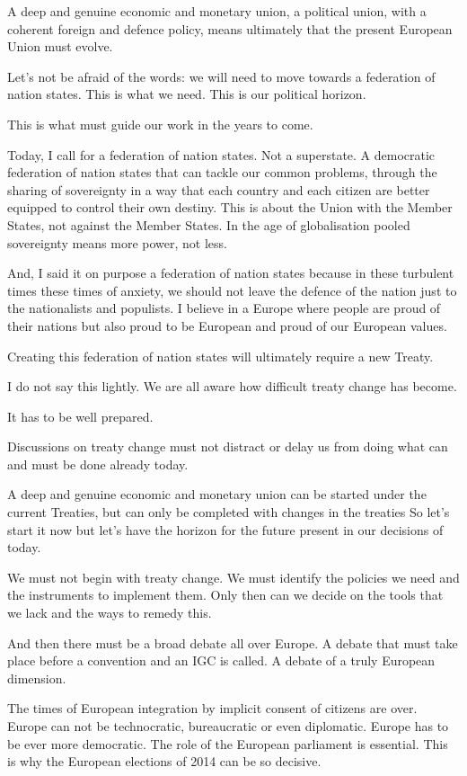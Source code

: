 \documentclass[a4paper,11pt]{article}
\begin{document}
A deep and genuine economic and monetary union, a political union, with a coherent foreign and defence policy, means ultimately that the present European Union must evolve.

Let's not be afraid of the words: we will need to move towards a federation of nation states. This is what we need. This is our political horizon.

This is what must guide our work in the years to come.

Today, I call for a federation of nation states. Not a superstate. A democratic federation of nation states that can tackle our common problems, through the sharing of sovereignty in a way that each country and each citizen are better equipped to control their own destiny. This is about the Union with the Member States, not against the Member States. In the age of globalisation pooled sovereignty means more power, not less.

And, I said it on purpose a federation of nation states because in these turbulent times these times of anxiety, we should not leave the defence of the nation just to the nationalists and populists. I believe in a Europe where people are proud of their nations but also proud to be European and proud of our European values.

Creating this federation of nation states will ultimately require a new Treaty.

I do not say this lightly. We are all aware how difficult treaty change has become.

It has to be well prepared.

Discussions on treaty change must not distract or delay us from doing what can and must be done already today.

A deep and genuine economic and monetary union can be started under the current Treaties, but can only be completed with changes in the treaties So let's start it now but let's have the horizon for the future present in our decisions of today.

We must not begin with treaty change. We must identify the policies we need and the instruments to implement them. Only then can we decide on the tools that we lack and the ways to remedy this.

And then there must be a broad debate all over Europe. A debate that must take place before a convention and an IGC is called. A debate of a truly European dimension.

The times of European integration by implicit consent of citizens are over. Europe can not be technocratic, bureaucratic or even diplomatic. Europe has to be ever more democratic. The role of the European parliament is essential. This is why the European elections of 2014 can be so decisive.
\end{document}
